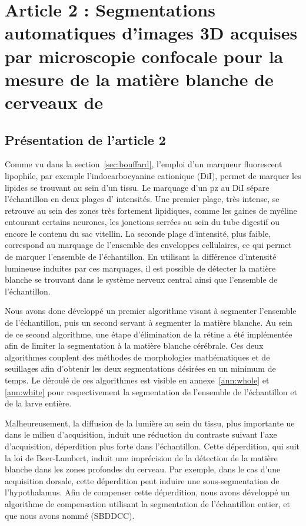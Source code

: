 \documentclass[\main/main.tex]{subfiles}
\begin{document}
\chapter{\label{sec:lempereur_info}
Article 2 : Segmentations automatiques d'images 3D acquises par microscopie confocale pour la mesure de la matière blanche de cerveaux de \pz{}
}

\section{Présentation de l'article 2}
%
Comme vu dans la section~\ref{sec:bouffard}, l'emploi d'un marqueur fluorescent lipophile, par exemple l'indocarbocyanine cationique (DiI), permet de marquer les lipides se trouvant au sein d'un tissu.
%
Le marquage d'un pz{} au DiI sépare l'échantillon en deux plages d' intensités.
%
Une premier plage, très intense,
se retrouve au sein des zones très fortement lipidiques,
comme les gaines de myéline entourant certains neurones,
les jonctions serrées au sein du tube digestif ou encore le contenu du sac vitellin.
%
La seconde plage d'intensité, plus faible, correspond au marquage de l'ensemble des
enveloppes cellulaires, ce qui permet de marquer l'ensemble de l'échantillon.
%
En utilisant la différence d'intensité lumineuse induites par ces marquages,
il est possible de détecter la matière blanche se trouvant
dans le système nerveux central ainsi que l'ensemble de l'échantillon.

%
Nous avons donc développé un premier algorithme visant à segmenter l'ensemble de l'échantillon,
puis un second servant à segmenter la matière blanche.
%
Au sein de ce second algorithme, une étape d'élimination de la rétine a été implémentée
afin de limiter la segmentation à la matière blanche cérébrale.
%
Ces deux algorithmes couplent des méthodes de morphologies mathématiques et de seuillages
afin d'obtenir les deux segmentations désirées en un minimum de temps.
%
Le déroulé de ces algorithmes est visible en annexe~\ref{ann:whole} et \ref{ann:white}
pour respectivement la segmentation de l'ensemble de l'échantillon et de la larve entière.

%
Malheureusement, la diffusion de la lumière au sein du tissu, plus importante ue dans le milieu d'acquisition, induit une réduction du contraste suivant l'axe d'acquisition, déperdition plus forte dans l'échantillon.
%
Cette déperdition, qui suit la loi de Beer-Lambert, induit une imprécision de la détection de la matière blanche dans les zones profondes du cerveau.
%
Par exemple, dans le cas d'une acquisition dorsale,
cette déperdition peut induire une sous-segmentation de l'hypothalamus.
%
Afin de compenser cette déperdition, nous avons développé un algorithme de compensation
utilisant la segmentation de l'échantillon entier, et que nous avons nommé \sbddcc{} (SBDDCC).
\end{document}
